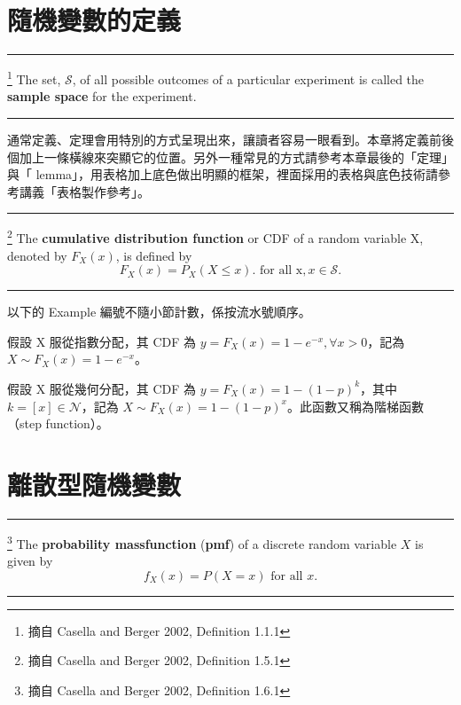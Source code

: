 \section{{\MB 隨機變數的定義}}
 \rule{\textwidth}{0.2pt}
 \begin{de}\footnote{摘自 Casella and Berger 2002, Definition 1.1.1}  %
The set, $\mathcal{S}$, of all possible outcomes of a particular experiment is called the \textbf{sample space} for the experiment.\\
 \rule{\textwidth}{0.2pt}
\end{de}
\noindent 通常定義、定理會用特別的方式呈現出來，讓讀者容易一眼看到。本章將定義前後個加上一條橫線來突顯它的位置。另外一種常見的方式請參考本章最後的「定理」與「 lemma」，用表格加上底色做出明顯的框架，裡面採用的表格與底色技術請參考講義「表格製作參考」。

\noindent \rule{\textwidth}{0.2pt}
\begin{de}\footnote{摘自 Casella and Berger 2002, Definition 1.5.1} %
The \textbf{cumulative distribution function}  or CDF of a random variable X, denoted by $F_X(x)$,
is defined by
\[F_X(x)=P_X(X \leq x). \mbox{ for all x}, x\in \mathcal{S}.\]
 \rule{\textwidth}{0.2pt}
\end{de}
\noindent 以下的 Example 編號不隨小節計數，係按流水號順序。
\begin{ex}[指數分配隨機變數的呈現] %
假設  X 服從指數分配，其 CDF 為 $y=F_X(x)=1-e^{-x}, \forall x>0$，記為 $X\sim F_X(x)=1-e^{-x}$。
\end{ex}

\begin{ex}[幾何分配隨機變數的呈現] %
假設 X 服從幾何分配，其 CDF 為 $y=F_X(x)=1-(1-p)^k$，其中 $k=[x]\in \mathcal{N}$，記為 $X\sim F_X(x)=1-(1-p)^x$。此函數又稱為階梯函數（step function）。
\end{ex}


\section{{\MB 離散型隨機變數}}
\noindent \rule{\textwidth}{0.2pt}
\begin{de}\footnote{摘自 Casella and Berger 2002, Definition 1.6.1} %
The \textbf{probability massfunction} (\textbf{pmf}) of a discrete random variable $X$ is given by
\[f_X(x)=P(X=x) \mbox{ for all } x.\]
\noindent \rule{\textwidth}{0.2pt}
\end{de}
\bigskip
 
